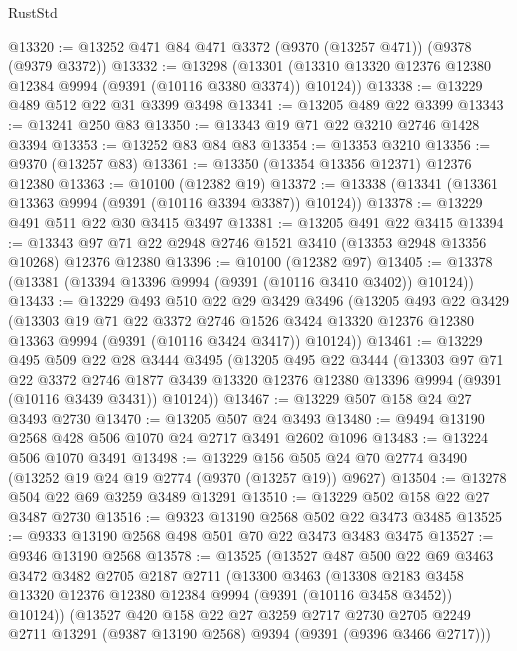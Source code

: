 \begin{lexlean}{RustStd}
\begin{coremodule}
@13320 := @13252 @471 @84 @471 @3372 (@9370 (@13257 @471)) (@9378 (@9379 @3372))
@13332 := @13298
    (@13301 (@13310 @13320 @12376 @12380 @12384 @9994 (@9391 (@10116 @3380 @3374)) @10124))
@13338 := @13229 @489 @512 @22 @31 @3399 @3498
@13341 := @13205 @489 @22 @3399
@13343 := @13241 @250 @83
@13350 := @13343 @19 @71 @22 @3210 @2746 @1428 @3394
@13353 := @13252 @83 @84 @83
@13354 := @13353 @3210
@13356 := @9370 (@13257 @83)
@13361 := @13350 (@13354 @13356 @12371) @12376 @12380
@13363 := @10100 (@12382 @19)
@13372 := @13338 (@13341 (@13361 @13363 @9994 (@9391 (@10116 @3394 @3387)) @10124))
@13378 := @13229 @491 @511 @22 @30 @3415 @3497
@13381 := @13205 @491 @22 @3415
@13394 := @13343 @97 @71 @22 @2948 @2746 @1521 @3410 (@13353 @2948 @13356 @10268) @12376 @12380
@13396 := @10100 (@12382 @97)
@13405 := @13378 (@13381 (@13394 @13396 @9994 (@9391 (@10116 @3410 @3402)) @10124))
@13433 := @13229
    @493
    @510
    @22
    @29
    @3429
    @3496
    (@13205
      @493
      @22
      @3429
      (@13303
        @19
        @71
        @22
        @3372
        @2746
        @1526
        @3424
        @13320
        @12376
        @12380
        @13363
        @9994
        (@9391 (@10116 @3424 @3417))
        @10124))
@13461 := @13229
    @495
    @509
    @22
    @28
    @3444
    @3495
    (@13205
      @495
      @22
      @3444
      (@13303
        @97
        @71
        @22
        @3372
        @2746
        @1877
        @3439
        @13320
        @12376
        @12380
        @13396
        @9994
        (@9391 (@10116 @3439 @3431))
        @10124))
@13467 := @13229 @507 @158 @24 @27 @3493 @2730
@13470 := @13205 @507 @24 @3493
@13480 := @9494 @13190 @2568 @428 @506 @1070 @24 @2717 @3491 @2602 @1096
@13483 := @13224 @506 @1070 @3491
@13498 := @13229 @156 @505 @24 @70 @2774 @3490 (@13252 @19 @24 @19 @2774 (@9370 (@13257 @19)) @9627)
@13504 := @13278 @504 @22 @69 @3259 @3489 @13291
@13510 := @13229 @502 @158 @22 @27 @3487 @2730
@13516 := @9323 @13190 @2568 @502 @22 @3473 @3485
@13525 := @9333 @13190 @2568 @498 @501 @70 @22 @3473 @3483 @3475
@13527 := @9346 @13190 @2568
@13578 := @13525
    (@13527
      @487
      @500
      @22
      @69
      @3463
      @3472
      @3482
      @2705
      @2187
      @2711
      (@13300
        @3463
        (@13308 @2183 @3458 @13320 @12376 @12380 @12384 @9994 (@9391 (@10116 @3458 @3452)) @10124))
      (@13527
        @420
        @158
        @22
        @27
        @3259
        @2717
        @2730
        @2705
        @2249
        @2711
        @13291
        (@9387 @13190 @2568)
        @9394
        (@9391 (@9396 @3466 @2717)))

\end{coremodule}
\end{lexlean}
